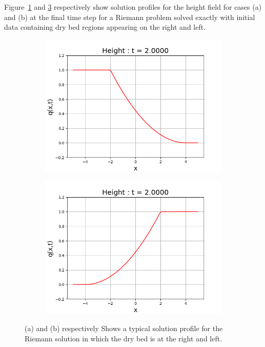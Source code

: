 \documentclass[12pt,a4paper]{article}
\begin{document}
	
	Figure~\ref{fig:right} and \ref{fig:left} respectively show solution profiles for the height field for cases (a) and (b) at the final time step for a Riemann problem  solved exactly with initial data containing dry bed regions appearing on the right and left.
	\begin{figure}[H]
		\begin{subfigure}[b]{0.5\textwidth}
			\centering
			\includegraphics[width=1.0\linewidth]{images/right}
			\caption{}
			\label{fig:right}
		\end{subfigure}
		\begin{subfigure}[b]{0.5\textwidth}
			\centering
			\includegraphics[width=1.0\linewidth]{images/left}
			\caption{}
			\label{fig:left}
		\end{subfigure}
		\caption{(a) and (b) respectively Shows a typical solution profile for the Riemann solution in which the dry bed is at the right and left. }
	\end{figure}
\end{document}
